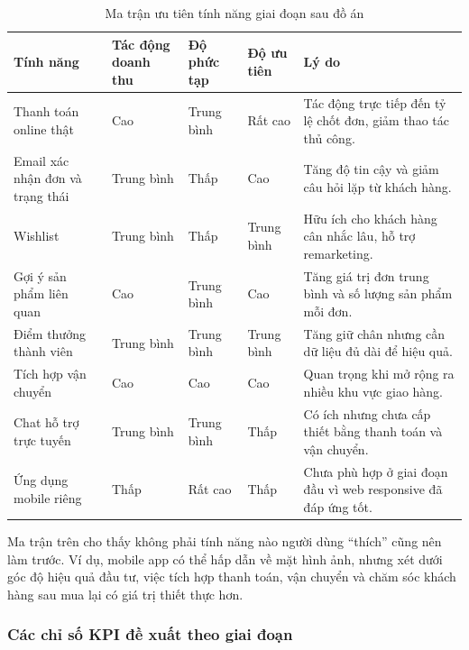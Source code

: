 \documentclass[11pt, a4paper]{article}
\begin{document}
\begin{table}[H]
    \centering
    \caption{Ma trận ưu tiên tính năng giai đoạn sau đồ án}
    \label{tab:feature-priority}
    \begin{tabularx}{\linewidth}{|>{\raggedright\arraybackslash}p{4.1cm}
                                  |>{\centering\arraybackslash}p{2.2cm}
                                  |>{\centering\arraybackslash}p{2.2cm}
                                  |>{\centering\arraybackslash}p{2.2cm}
                                  |Y|}
        \hline
        \textbf{Tính năng} & \textbf{Tác động doanh thu} & \textbf{Độ phức tạp} & \textbf{Độ ưu tiên} & \textbf{Lý do} \\ \hline
        Thanh toán online thật & Cao & Trung bình & Rất cao & Tác động trực tiếp đến tỷ lệ chốt đơn, giảm thao tác thủ công. \\ \hline
        Email xác nhận đơn và trạng thái & Trung bình & Thấp & Cao & Tăng độ tin cậy và giảm câu hỏi lặp từ khách hàng. \\ \hline
        Wishlist & Trung bình & Thấp & Trung bình & Hữu ích cho khách hàng cân nhắc lâu, hỗ trợ remarketing. \\ \hline
        Gợi ý sản phẩm liên quan & Cao & Trung bình & Cao & Tăng giá trị đơn trung bình và số lượng sản phẩm mỗi đơn. \\ \hline
        Điểm thưởng thành viên & Trung bình & Trung bình & Trung bình & Tăng giữ chân nhưng cần dữ liệu đủ dài để hiệu quả. \\ \hline
        Tích hợp vận chuyển & Cao & Cao & Cao & Quan trọng khi mở rộng ra nhiều khu vực giao hàng. \\ \hline
        Chat hỗ trợ trực tuyến & Trung bình & Trung bình & Thấp & Có ích nhưng chưa cấp thiết bằng thanh toán và vận chuyển. \\ \hline
        Ứng dụng mobile riêng & Thấp & Rất cao & Thấp & Chưa phù hợp ở giai đoạn đầu vì web responsive đã đáp ứng tốt. \\ \hline
    \end{tabularx}
\end{table}

Ma trận trên cho thấy không phải tính năng nào người dùng ``thích'' cũng nên làm trước.
Ví dụ, mobile app có thể hấp dẫn về mặt hình ảnh, nhưng xét dưới góc độ hiệu quả đầu tư,
việc tích hợp thanh toán, vận chuyển và chăm sóc khách hàng sau mua lại có giá trị thiết thực hơn.

\subsubsection{Các chỉ số KPI đề xuất theo giai đoạn}
\end{document}
